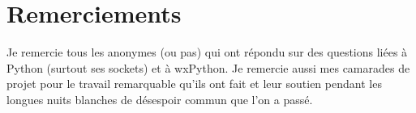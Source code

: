 \documentclass[a4paper, 11pt]{report}
\begin{document}
\section{Remerciements}
Je remercie tous les anonymes (ou pas) qui ont répondu sur des questions liées à Python
 (surtout ses sockets) et à wxPython. Je remercie aussi mes camarades de projet pour le travail remarquable qu'ils ont fait et 
leur soutien pendant les longues nuits blanches de désespoir commun que l'on a passé.
\end{document}
